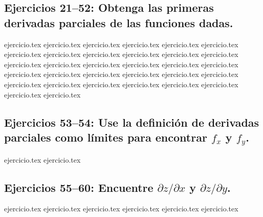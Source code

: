 \subsection*{Ejercicios 21--52: Obtenga las primeras derivadas parciales de las funciones dadas.}
\begin{enumerate}
    \setcounter{enumi}{20}
    {ejercicio.tex}
    {ejercicio.tex}
    {ejercicio.tex}
    {ejercicio.tex}
    {ejercicio.tex}
    {ejercicio.tex}
    {ejercicio.tex}
    {ejercicio.tex}
    {ejercicio.tex}
    {ejercicio.tex}
    {ejercicio.tex}
    {ejercicio.tex}
    {ejercicio.tex}
    {ejercicio.tex}
    {ejercicio.tex}
    {ejercicio.tex}
    {ejercicio.tex}
    {ejercicio.tex}
    {ejercicio.tex}
    {ejercicio.tex}
    {ejercicio.tex}
    {ejercicio.tex}
    {ejercicio.tex}
    {ejercicio.tex}
    {ejercicio.tex}
    {ejercicio.tex}
    {ejercicio.tex}
    {ejercicio.tex}
    {ejercicio.tex}
    {ejercicio.tex}
    {ejercicio.tex}
    {ejercicio.tex}
\end{enumerate}

\subsection*{Ejercicios 53--54: Use la definición de derivadas parciales como límites para encontrar $f_x$ y $f_y$.}
\begin{enumerate}
    \setcounter{enumi}{52}
    {ejercicio.tex}
    {ejercicio.tex}
\end{enumerate}

\subsection*{Ejercicios 55--60: Encuentre $\partial z/\partial x$ y $\partial z/\partial y$.}
\begin{enumerate}
    \setcounter{enumi}{54}
    {ejercicio.tex}
    {ejercicio.tex}
    {ejercicio.tex}
    {ejercicio.tex}
    {ejercicio.tex}
    {ejercicio.tex}
\end{enumerate}


